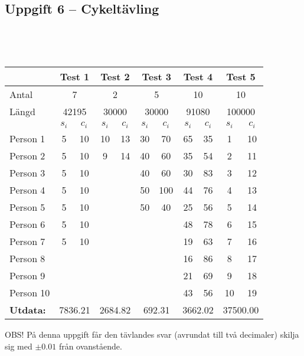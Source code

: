 \documentclass[a4paper,12pt,oneside]{amsbook}
\theoremstyle{test}
\newcommand{\fe}[1]{\textbf{#1}}            %
\begin{document}
\subsection*{Uppgift 6 -- Cykeltävling}
~\\
{\tt 
\begin{tabular}{||l||c|c||c|c||c|c||c|c||c|c||}\hline\hline
& \multicolumn{2}{c||}{\fe{Test 1}} & \multicolumn{2}{c||}{\fe{Test 2}}& \multicolumn{2}{c||}{\fe{Test 3}} & \multicolumn{2}{c||}{\fe{Test 4}} & \multicolumn{2}{c||}{\fe{Test 5}} \\\hline\hline
Antal & \multicolumn{2}{c||}{ 7 }& \multicolumn{2}{c||}{ 2} & \multicolumn{2}{c||}{ 5} & \multicolumn{2}{c||}{ 10}& \multicolumn{2}{c||}{ 10}\\ \hline
Längd& \multicolumn{2}{c||}{ 42195 }& \multicolumn{2}{c||}{ 30000} & \multicolumn{2}{c||}{ 30000} & \multicolumn{2}{c||}{ 91080}& \multicolumn{2}{c||}{ 100000}\\ \hline
& \fe{$s_i$} & \fe{$c_i$} & \fe{$s_i$} & \fe{$c_i$}& \fe{$s_i$} & \fe{$c_i$}& \fe{$s_i$} & \fe{$c_i$}& \fe{$s_i$} & \fe{$c_i$} \\ \hline
Person 1	&	5	&	10	&	10	&	13	&	30	&	70	&	65	&	35	&	1	&	10	\\
Person 2	&	5	&	10	&	9	&	14	&	40	&	60	&	35	&	54	&	2	&	11	\\
Person 3	&	5	&	10	&		&		&	40	&	60	&	30	&	83	&	3	&	12	\\
Person 4	&	5	&	10	&		&		&	50	&	100	&	44	&	76	&	4	&	13	\\
Person 5	&	5	&	10	&		&		&	50	&	40	&	25	&	56	&	5	&	14	\\
Person 6	&	5	&	10	&		&		&		&		&	48	&	78	&	6	&	15	\\
Person 7	&	5	&	10	&		&		&		&		&	19	&	63	&	7	&	16	\\
Person 8	&		&		&		&		&		&		&	16	&	86	&	8	&	17	\\
Person 9	&		&		&		&		&		&		&	21	&	69	&	9	&	18	\\
Person 10	&		&		&		&		&		&		&	43	&	56	&	10	&	19	\\ \hline\hline
\fe{Utdata:} & \multicolumn{2}{c||}{ 7836.21 }& \multicolumn{2}{c||}{ 2684.82} & \multicolumn{2}{c||}{ 692.31} & \multicolumn{2}{c||}{ 3662.02}& \multicolumn{2}{c||}{ 37500.00} \\ \hline\hline
\end{tabular}
}

OBS! På denna uppgift får den tävlandes svar (avrundat till två decimaler) skilja sig med $\pm 0.01$ från ovanstående.
\end{document}
